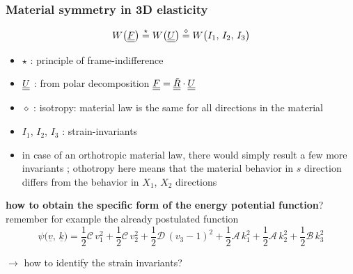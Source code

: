 \begin{frame}
  \frametitle{Material symmetry in 3D elasticity}

  \begin{displaymath}
    W \bigl( \underline{\underline{F}} \bigr) \overset{\star}{=}
    W \bigl( \underline{\underline{U}} \bigr) \overset{\diamond}{=}
    W \bigl( I_1, \, I_2, \, I_3 \bigr)
  \end{displaymath}
  
  \vspace{0.5em}
  \begin{itemize}
    \item $\star$ : principle of frame-indifference
    \item $\underline{\underline{U}}$ : from polar decomposition $\underline{\underline{F}} = \underline{\underline{\tilde{R}}} \cdot \underline{\underline{U}}$
    \item $\diamond$ : isotropy: material law is the same for all directions in the material
    \item $I_1$, $I_2$, $I_3$ : strain-invariants
    \item in case of an orthotropic material law, there would simply result a few more invariants ; \newline
      othotropy here means that the material behavior in $s$ direction differs from the behavior in $X_1$, $X_2$ directions
  \end{itemize}
  
  \vspace{1em}
  \textbf{how to obtain the specific form of the energy potential function}? \newline
  remember for example the already postulated function
  \vspace{0.53em}
  \begin{displaymath}
    \psi \bigl( \underline{v}, \, \underline{k} \bigr) =
    \frac{1}{2} \mathscr{C} \, v_1^2 +
    \frac{1}{2} \mathscr{C} \, v_2^2 +
    \frac{1}{2} \mathscr{D} \, (v_3-1)^2 +
    \frac{1}{2} \mathscr{A} \, k_1^2 +
    \frac{1}{2} \mathscr{A} \, k_2^2 +
    \frac{1}{2} \mathscr{B} \, k_3^2
  \end{displaymath}
  
  \vspace{0.3em}
  $\rightarrow$ how to identify the strain invariants? \newline
\end{frame}


